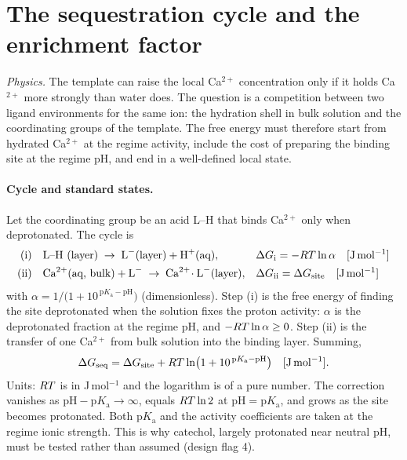 \section{The sequestration cycle and the enrichment factor}\label{th:sec:sequestration}

\textit{Physics.} The template can raise the local Ca$^{2+}$ concentration only if it holds
Ca$^{2+}$ more strongly than water does. The question is a competition between two ligand
environments for the same ion: the hydration shell in bulk solution and the coordinating groups
of the template. The free energy must therefore start from hydrated Ca$^{2+}$ at the regime
activity, include the cost of preparing the binding site at the regime pH, and end in a
well-defined local state.

\paragraph{Cycle and standard states.} Let the coordinating group be an acid L--H that binds
Ca$^{2+}$ only when deprotonated. The cycle is
\begin{align}
\text{(i)}\quad &\text{L--H (layer)} \;\to\; \text{L}^{-}\text{(layer)} + \text{H}^{+}\text{(aq)},
&&\Delta G_\mathrm{i}=-R T\ln\alpha \quad[\mathrm{J\,mol^{-1}}]\nonumber\\
\text{(ii)}\quad &\text{Ca}^{2+}\text{(aq, bulk)} + \text{L}^{-} \;\to\; \text{Ca}^{2+}\!\cdot\text{L}^{-}\text{(layer)},
&&\Delta G_\mathrm{ii}=\Delta G_\mathrm{site} \quad[\mathrm{J\,mol^{-1}}]\nonumber
\end{align}
with $\alpha=1/\big(1+10^{\,\mathrm{p}K_\mathrm{a}-\mathrm{pH}}\big)$ (dimensionless).
Step (i) is the free energy of finding the site deprotonated when the solution fixes the proton
activity: $\alpha$ is the deprotonated fraction at the regime pH, and $-R T\ln\alpha\ge0$. Step
(ii) is the transfer of one Ca$^{2+}$ from bulk solution into the binding layer. Summing,
\begin{equation}\label{th:eq:cycle}
\Delta G_\mathrm{seq}=\Delta G_\mathrm{site}+R T\ln\!\big(1+10^{\,\mathrm{p}K_\mathrm{a}-\mathrm{pH}}\big) \quad[\mathrm{J\,mol^{-1}}].
\end{equation}
Units: $R T$ is in J\,mol$^{-1}$ and the logarithm is of a pure number. The correction vanishes
as $\mathrm{pH}-\mathrm{p}K_\mathrm{a}\to\infty$, equals $R T\ln2$ at $\mathrm{pH}=\mathrm{p}K_\mathrm{a}$, and
grows as the site becomes protonated. Both $\mathrm{p}K_\mathrm{a}$ and the activity coefficients are
taken at the regime ionic strength. This is why catechol, largely protonated near neutral pH,
must be tested rather than assumed (design flag 4).

